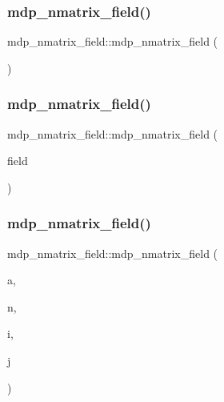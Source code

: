 \subsubsection{\texorpdfstring{mdp\+\_\+nmatrix\+\_\+field()}{mdp\_nmatrix\_field()}\hspace{0.1cm}{\footnotesize\ttfamily [1/3]}}
{\footnotesize\ttfamily mdp\+\_\+nmatrix\+\_\+field\+::mdp\+\_\+nmatrix\+\_\+field (\begin{DoxyParamCaption}{ }\end{DoxyParamCaption})\hspace{0.3cm}{\ttfamily [inline]}}

\mbox{\label{classmdp__nmatrix__field_a8a3db6bfa6ffc2a5679c24f3e297e0c4}} 
\subsubsection{\texorpdfstring{mdp\+\_\+nmatrix\+\_\+field()}{mdp\_nmatrix\_field()}\hspace{0.1cm}{\footnotesize\ttfamily [2/3]}}
{\footnotesize\ttfamily mdp\+\_\+nmatrix\+\_\+field\+::mdp\+\_\+nmatrix\+\_\+field (\begin{DoxyParamCaption}\item[{\hyperlink{classmdp__nmatrix__field}{mdp\+\_\+nmatrix\+\_\+field} \&}]{field }\end{DoxyParamCaption})\hspace{0.3cm}{\ttfamily [inline]}}

\mbox{\label{classmdp__nmatrix__field_a10d00272d103d471a1cd9e5921d39419}} 
\subsubsection{\texorpdfstring{mdp\+\_\+nmatrix\+\_\+field()}{mdp\_nmatrix\_field()}\hspace{0.1cm}{\footnotesize\ttfamily [3/3]}}
{\footnotesize\ttfamily mdp\+\_\+nmatrix\+\_\+field\+::mdp\+\_\+nmatrix\+\_\+field (\begin{DoxyParamCaption}\item[{\hyperlink{classmdp__lattice}{mdp\+\_\+lattice} \&}]{a,  }\item[{int}]{n,  }\item[{int}]{i,  }\item[{int}]{j }\end{DoxyParamCaption})\hspace{0.3cm}{\ttfamily [inline]}}



